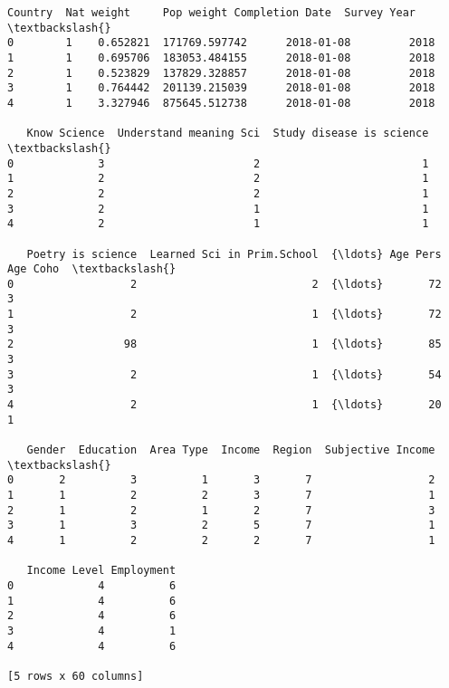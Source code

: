 \documentclass[11pt]{article}
\makeatletter
\newcommand{\boxspacing}{\kern\kvtcb@left@rule\kern\kvtcb@boxsep}
\newcommand{\prompt}[4]{
        {\ttfamily\llap{{\color{#2}[#3]:\hspace{3pt}#4}}\vspace{-\baselineskip}}
    }
\makeatother
\begin{document}
            \begin{tcolorbox}[breakable, size=fbox, boxrule=.5pt, pad at break*=1mm, opacityfill=0]
\prompt{Out}{outcolor}{27}{\boxspacing}
\begin{Verbatim}[commandchars=\\\{\}]
   Country  Nat weight     Pop weight Completion Date  Survey Year  \textbackslash{}
0        1    0.652821  171769.597742      2018-01-08         2018
1        1    0.695706  183053.484155      2018-01-08         2018
2        1    0.523829  137829.328857      2018-01-08         2018
3        1    0.764442  201139.215039      2018-01-08         2018
4        1    3.327946  875645.512738      2018-01-08         2018

   Know Science  Understand meaning Sci  Study disease is science  \textbackslash{}
0             3                       2                         1
1             2                       2                         1
2             2                       2                         1
3             2                       1                         1
4             2                       1                         1

   Poetry is science  Learned Sci in Prim.School  {\ldots} Age Pers Age Coho  \textbackslash{}
0                  2                           2  {\ldots}       72        3
1                  2                           1  {\ldots}       72        3
2                 98                           1  {\ldots}       85        3
3                  2                           1  {\ldots}       54        3
4                  2                           1  {\ldots}       20        1

   Gender  Education  Area Type  Income  Region  Subjective Income  \textbackslash{}
0       2          3          1       3       7                  2
1       1          2          2       3       7                  1
2       1          2          1       2       7                  3
3       1          3          2       5       7                  1
4       1          2          2       2       7                  1

   Income Level Employment
0             4          6
1             4          6
2             4          6
3             4          1
4             4          6

[5 rows x 60 columns]
\end{Verbatim}
\end{tcolorbox}
        
    \begin{tcolorbox}[breakable, size=fbox, boxrule=1pt, pad at break*=1mm,colback=cellbackground, colframe=cellborder]
\prompt{In}{incolor}{ }{\boxspacing}
\begin{Verbatim}[commandchars=\\\{\}]

\end{Verbatim}
\end{tcolorbox}
\end{document}
